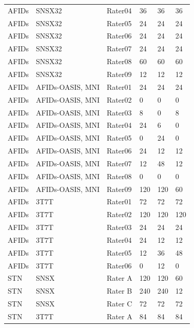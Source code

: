 \begin{table}[htbp]
\begin{tabular}{llllll}
AFIDs & SNSX32 & Rater04 & 36 & 36 & 36 \\
AFIDs & SNSX32 & Rater05 & 24 & 24 & 24 \\
AFIDs & SNSX32 & Rater06 & 24 & 24 & 24 \\
AFIDs & SNSX32 & Rater07 & 24 & 24 & 24 \\
AFIDs & SNSX32 & Rater08 & 60 & 60 & 60 \\
AFIDs & SNSX32 & Rater09 & 12 & 12 & 12 \\
AFIDs & AFIDs-OASIS, MNI & Rater01 & 24 & 24 & 24 \\
AFIDs & AFIDs-OASIS, MNI & Rater02 & 0 & 0 & 0 \\
AFIDs & AFIDs-OASIS, MNI & Rater03 & 8 & 0 & 8 \\
AFIDs & AFIDs-OASIS, MNI & Rater04 & 24 & 6 & 0 \\
AFIDs & AFIDs-OASIS, MNI & Rater05 & 0 & 24 & 0 \\
AFIDs & AFIDs-OASIS, MNI & Rater06 & 24 & 12 & 12 \\
AFIDs & AFIDs-OASIS, MNI & Rater07 & 12 & 48 & 12 \\
AFIDs & AFIDs-OASIS, MNI & Rater08 & 0 & 0 & 0 \\
AFIDs & AFIDs-OASIS, MNI & Rater09 & 120 & 120 & 60 \\
AFIDs & 3T7T & Rater01 & 72 & 72 & 72 \\
AFIDs & 3T7T & Rater02 & 120 & 120 & 120 \\
AFIDs & 3T7T & Rater03 & 24 & 24 & 24 \\
AFIDs & 3T7T & Rater04 & 24 & 12 & 12 \\
AFIDs & 3T7T & Rater05 & 12 & 36 & 48 \\
AFIDs & 3T7T & Rater06 & 0 & 12 & 0 \\
STN & SNSX & Rater A & 120 & 120 & 60 \\
STN & SNSX & Rater B & 240 & 240 & 12 \\
STN & SNSX & Rater C & 72 & 72 & 72 \\
STN & 3T7T & Rater A & 84 & 84 & 84 \\
\bottomrule
\end{tabular}
\label{tab:rater_demographic_data}
\end{table}


\newpage
